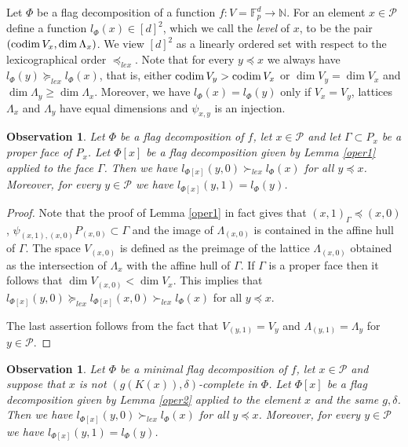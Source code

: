 \documentclass{daj}
\renewcommand{\ge}{\geqslant}
\newcommand{\N}{\mathbb N}
\newcommand{\FF}{\mathbb F}
\newcommand{\codim}{{\rm codim}\,}
\renewcommand{\P}{\mathcal P}
\newtheorem{obs}[theorem]{Observation}
\theoremstyle{definition}
\theoremstyle{remark}
\theoremstyle{definition}
\theoremstyle{definition}
\begin{document}
Let $\Phi$ be a flag decomposition of a function $f: V=\FF_p^d \rightarrow \N$. For an element $x \in \P$ define a function $l_\Phi(x) \in [d]^2$, which we call the \emph{level} of $x$, to be the pair $(\codim V_x, \dim \Lambda_x)$. We view $[d]^2$ as a linearly ordered set with respect to the lexicographical order $\preceq_{lex}$. Note that for every $y \preceq x$ we always have $l_\Phi(y) \succeq_{lex} l_\Phi(x)$, that is, either $\codim V_y >  \codim V_x$ or $\dim V_y = \dim V_x$ and $\dim \Lambda_y \ge \dim \Lambda_x$. Moreover, we have $l_\Phi(x) = l_\Phi(y)$ only if $V_x = V_y$, lattices $\Lambda_x$ and $\Lambda_y$ have equal dimensions and $\psi_{x, y}$ is an injection.

\begin{obs}\label{level1}
Let $\Phi$ be a flag decomposition of $f$, let $x \in \P$ and let $\Gamma \subset P_x$ be a proper face of $P_x$. Let $\Phi[x]$ be a  flag decomposition given by Lemma \ref{oper1} applied to the face $\Gamma$. Then we have $l_{\Phi[x]}(y, 0) \succ_{lex} l_{\Phi}(x)$ for all $y \preceq x$.  Moreover, for every $y \in \P$ we have $l_{\Phi[x]}(y, 1) = l_\Phi(y)$.
\end{obs}

\begin{proof}
Note that the proof of Lemma \ref{oper1} in fact gives that $(x, 1)_\Gamma \preceq (x,0)$, $\psi_{(x, 1), (x, 0)} P_{(x,0)} \subset \Gamma$ and the image of $\Lambda_{(x,0)}$ is contained in the affine hull of $\Gamma$. The space $V_{(x,0)}$ is defined as the preimage of the lattice $\Lambda_{(x, 0)}$ obtained as the intersection of $\Lambda_x$ with the affine hull of $\Gamma$. If $\Gamma$ is a proper face then it follows that $\dim V_{(x,0)} < \dim V_x$. This implies that $l_{\Phi[x]}(y, 0) \succeq_{lex} l_{\Phi[x]}(x, 0) \succ_{lex} l_\Phi(x)$ for all $y \preceq x$.

The last assertion follows from the fact that $V_{(y, 1)} = V_y$ and $\Lambda_{(y, 1)} = \Lambda_y$ for $y\in \P$.
\end{proof}

\begin{obs}\label{level2}
Let $\Phi$ be a minimal flag decomposition of $f$, let $x \in \P$ and suppose that $x$ is not $(g(K(x)), \delta)$-complete in $\Phi$. Let $\Phi[x]$ be a flag decomposition given by Lemma \ref{oper2} applied to the element $x$ and the same $g, \delta$. Then we have $l_{\Phi[x]}(y, 0) \succ_{lex} l_{\Phi}(x)$ for all $y \preceq x$. Moreover, for every $y \in \P$ we have $l_{\Phi[x]}(y, 1) = l_\Phi(y)$.
\end{obs}
\end{document}
